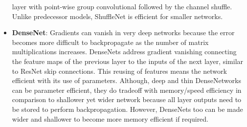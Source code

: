 \begin{itemize}
          layer with point-wise group convolutional followed by the channel
          shuffle. Unlike predecessor models, ShuffleNet is efficient for smaller
          networks.
    \item \textbf{DenseNet}: Gradients can vanish in very deep networks because
          the error becomes more difficult to backpropagate as the number of
          matrix multiplications increases. DenseNets address gradient vanishing
          connecting the feature maps of the previous layer to the inputs of the
          next layer, similar to ResNet skip connections. This reusing of features
          means the network efficient with its use of parameters. Although, deep
          and thin DenseNetworks can be parameter efficient, they do tradeoff
          with memory/speed efficiency in comparison to shallower yet wider network
          because all layer outputs need to be stored to perform backpropagation.
          However, DenseNets too can be made wider and shallower to become more
          memory efficient if required.
\end{itemize}